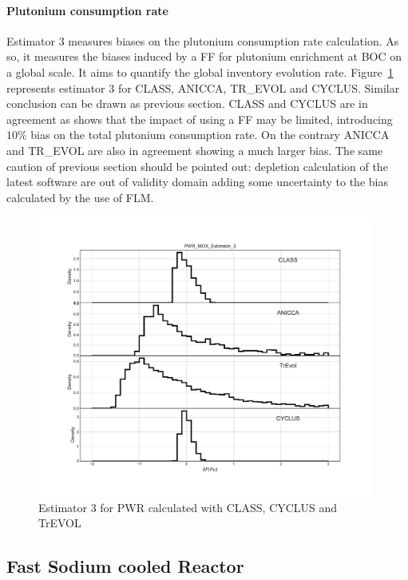 \paragraph{Plutonium consumption rate}

Estimator 3 measures biases on the plutonium consumption rate calculation. As
so, it measures the biases induced by a \gls{FF} for plutonium enrichment at
\gls{BOC} on a global scale. It aims to quantify the global inventory evolution
rate.  Figure~\ref{fig:Est3_PWR} represents estimator 3 for CLASS, ANICCA,
TR\_EVOL and CYCLUS. Similar conclusion can be drawn as previous section. CLASS
and CYCLUS are in agreement as shows that the impact of using a \gls{FF} may be
limited, introducing $10\%$ bias on the total plutonium consumption rate. On the
contrary ANICCA and TR\_EVOL are also in agreement showing a much larger bias.
The same caution of previous section should be pointed out: depletion
calculation of the latest software are out of validity domain adding some
uncertainty to the bias calculated by the use of \gls{FLM}.       

\begin{figure}[h]
	\begin{center}
		\includegraphics[width = 0.99\textwidth]{../../Feature_1/RAW_DATA/FIG/PWR_MOX_Estimator_3.pdf}
		\caption{Estimator 3 for \gls{PWR} calculated with CLASS, CYCLUS and TrEVOL}
		\label{fig:Est3_PWR}
	\end{center}
\end{figure}

\subsection{Fast Sodium cooled Reactor}

